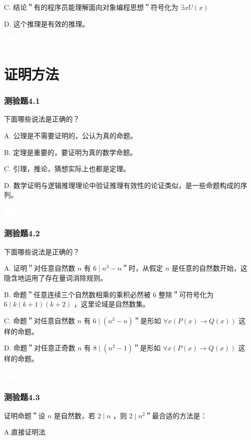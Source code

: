 \documentclass[UTF8, heading=true]{ctexart}
\begin{document}
C. 结论＂有的程序员能理解面向对象编程思想＂符号化为 $\exists x U(x)$

D. 这个推理是有效的推理。

\textcolor{white}{答案：AC}


\clearpage

\section{证明方法}

\subsubsection{测验题4.1}

下面哪些说法是正确的？

A. 公理是不需要证明的，公认为真的命题。

B. 定理是重要的，要证明为真的数学命题。

C. 引理，推论，猜想实际上也都是定理。

D. 数学证明与逻辑推理理论中验证推理有效性的论证类似，是一些命题构成的序列。


\textcolor{white}{答案：ABD}


\subsubsection{测验题4.2}

下面哪些说法是正确的？

A. 证明＂对任意自然数 $n$ 有 $6 \mid n^3-n$＂时，从假定 $n$ 是任意的自然数开始，这隐含地运用了存在量词消除规则。

B. 命题＂任意连续三个自然数相乘的乘积必然被 6 整除＂可符号化为 $6 \mid k(k+1)(k+2)$ ，这里论域是自然数集。

C. 命题＂对任意自然数 $n$ 有 $6 \mid\left(n^3-n\right)$＂是形如 $\forall x(P(x) \rightarrow Q(x))$ 这样的命题。

D.  命题＂对任意正奇数 $n$ 有 $8 \mid\left(n^2-1\right)$＂是形如 $\forall x(P(x) \rightarrow Q(x))$ 这样的命题。

\textcolor{white}{答案：CD}

\subsubsection{测验题4.3}

证明命题＂设 $n$ 是自然数，若 $2 \mid n$ ，则 $2 \mid n^2$＂最合适的方法是：

A.直接证明法
\end{document}
